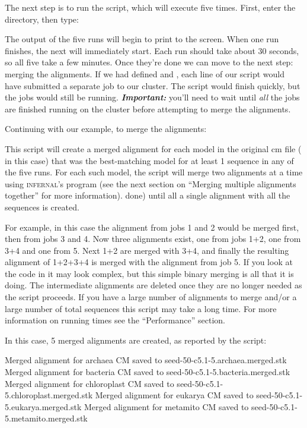 The next step is to run the  script, which will
execute  five times. First, enter the
 directory, then type:


The output of the five  runs will begin to print to
the screen. When one run finishes, the next will immediately
start. Each run should take about 30 seconds, so all five take a few
minutes. Once they're done we can move to the next step: merging the
alignments. If we had defined  and
, each line of our script would have submitted
a separate job to our cluster. The script would finish quickly, but
the jobs would still be running. \textbf{\emph{Important: }} you'll
need to wait until \emph{all} the jobs are finished running on the
cluster before attempting to merge the alignments. 

Continuing with our example, to merge the alignments:

This script will create a merged alignment for each model in the
original cm file ( in this case) that was the
best-matching model for at least 1 sequence in any of the five runs.
For each such model, the script will merge two alignments at a time
using \textsc{infernal}'s  program (see the next section
on ``Merging multiple alignments together'' for more information).
done) until all a single alignment with all the sequences is
created. 

For example, in this case the alignment from jobs 1 and 2 would be
merged first, then from jobs 3 and 4. Now three alignments exist, one
from jobs 1+2, one from 3+4 and one from 5. Next 1+2 are merged with
3+4, and finally the resulting alignment of 1+2+3+4 is merged with the
alignment from job 5. If you look at the code in
 it may look complex, but this simple binary
merging is all that it is doing. The intermediate alignments are
deleted once they are no longer needed as the script proceeds. If you
have a large number of alignments to merge and/or a large number of total
sequences this script may take a long time. For more information on
running times see the ``Performance'' section.

In this case, 5 merged alignments are created, as reported by the
script:

\begin{sreoutput}
Merged alignment for archaea     CM saved to seed-50-c5.1-5.archaea.merged.stk
Merged alignment for bacteria    CM saved to seed-50-c5.1-5.bacteria.merged.stk
Merged alignment for chloroplast CM saved to seed-50-c5.1-5.chloroplast.merged.stk
Merged alignment for eukarya     CM saved to seed-50-c5.1-5.eukarya.merged.stk
Merged alignment for metamito    CM saved to seed-50-c5.1-5.metamito.merged.stk
\end{sreoutput}

